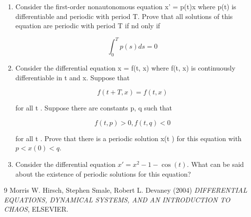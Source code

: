 \documentclass[12pt]{article}
\begin{document}
\begin{enumerate}
\item Consider the first-order nonautonomous equation x' = p(t)x where
p(t) is differentiable and periodic with period T. Prove that all solutions of this equation are periodic with period T if nd only if

\[
\int_0^T p(s) ds = 0
\]

\item Consider the differential equation x = f(t, x) where f(t, x) is continuously differentiable in t and x. Suppose that

\[
f (t + T, x) = f (t , x)
\]

for all t . Suppose there are constants p, q such that

\[
f (t , p) > 0, f (t , q) < 0
\]

for all t . Prove that there is a periodic solution x(t ) for this equation with
$p < x(0) < q$.

\item Consider the differential equation $x'= x^2 - 1 - \cos (t)$. What can be said about the existence of periodic solutions for this equation?

\end{enumerate}

\begin{thebibliography}{9}
Morris W. Hirsch, Stephen Smale, Robert L. Devaney (2004) \emph{DIFFERENTIAL EQUATIONS,
DYNAMICAL SYSTEMS, AND
AN INTRODUCTION
TO CHAOS}, ELSEVIER.

\end{thebibliography}
\end{document}
